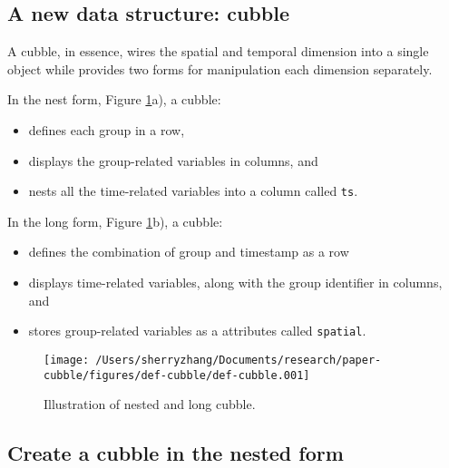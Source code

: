 \documentclass[
]{jss}
\providecommand{\tightlist}{%
  \setlength{\itemsep}{0pt}\setlength{\parskip}{0pt}}
\begin{document}
\hypertarget{a-new-data-structure-cubble}{%
\subsection{A new data structure:
cubble}\label{a-new-data-structure-cubble}}

A cubble, in essence, wires the spatial and temporal dimension into a
single object while provides two forms for manipulation each dimension
separately.

In the nest form, Figure \ref{fig:def-cubble}a), a cubble:

\begin{itemize}
\tightlist
\item
  defines each group in a row,
\item
  displays the group-related variables in columns, and
\item
  nests all the time-related variables into a column called \texttt{ts}.
\end{itemize}

In the long form, Figure \ref{fig:def-cubble}b), a cubble:

\begin{itemize}
\tightlist
\item
  defines the combination of group and timestamp as a row
\item
  displays time-related variables, along with the group identifier in
  columns, and
\item
  stores group-related variables as a attributes called
  \texttt{spatial}.
\end{itemize}

\begin{CodeChunk}
\begin{figure}

{\centering \texttt{[image: /Users/sherryzhang/Documents/research/paper-cubble/figures/def-cubble/def-cubble.001]} 

}

\caption[Illustration of nested and long cubble]{Illustration of nested and long cubble.}\label{fig:def-cubble}
\end{figure}
\end{CodeChunk}

\newpage

\hypertarget{create-a-cubble-in-the-nested-form}{%
\subsection{Create a cubble in the nested
form}\label{create-a-cubble-in-the-nested-form}}
\end{document}
